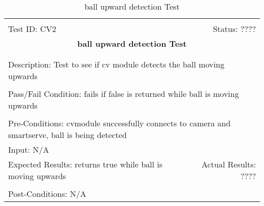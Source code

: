 \documentclass[11pt]{article}
\begin{document}
\begin{center}
\begin{table}[H]
\begin{tabular}{|l r|}\hline&\\[-2mm]
	Test ID: CV2	&Status: ????\\[-3mm]
	\multicolumn{2}{|c|}{\textbf{\large{ball upward detection Test}}}\\&\\\hline&\\[-3mm]
	\multicolumn{2}{|p{\textwidth}|}{Description: Test to see if cv module detects the ball moving upwards}\\[1mm]\hline&\\[-3mm]
	\multicolumn{2}{|p{\textwidth}|}{Pass/Fail Condition: fails if false is returned while ball is moving upwards }\\[1mm]\hline&\\[-3mm]
	\multicolumn{2}{|p{\textwidth}|}{Pre-Conditions: cvmodule successfully connects to camera and smartserve, ball is being detected}\\[4mm]
	\multicolumn{2}{|p{\textwidth}|}{Input: N/A}\\[2mm]\hline
	\multicolumn{1}{|p{0.49\textwidth}}{Expected Results: returns true while ball is moving upwards}	&\multicolumn{1}{|p{0.45\textwidth}|}{Actual Results: ????}\\\hline&\\[-3mm]
	\multicolumn{2}{|p{\textwidth}|}{Post-Conditions: N/A}\\\hline
\end{tabular}
\caption{ball upward detection Test}
\end{table}
\end{center}
\end{document}
